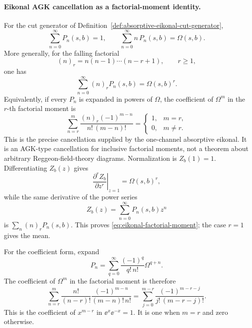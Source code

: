 \paragraph{Eikonal AGK cancellation as a factorial-moment identity.}
For the cut generator of
Definition~\ref{def:absorptive-eikonal-cut-generator},
\begin{equation}
  \sum_{n=0}^\infty P_n(s,b)=1,
  \qquad
  \sum_{n=0}^\infty n\,P_n(s,b)=\Omega(s,b).
  \label{eq:eikonal-cut-normalization-and-mean}
\end{equation}
More generally, for the falling factorial
\begin{equation}
  (n)_r=n(n-1)\cdots(n-r+1),
  \qquad r\ge1,
  \label{eq:falling-factorial-definition}
\end{equation}
one has
\begin{equation}
  \sum_{n=0}^\infty (n)_rP_n(s,b)=\Omega(s,b)^r.
  \label{eq:eikonal-factorial-moment}
\end{equation}
Equivalently, if every \(P_n\) is expanded in powers of \(\Omega\), the
coefficient of \(\Omega^m\) in the \(r\)-th factorial moment is
\begin{equation}
  \sum_{n=r}^{m}
  \frac{(n)_r(-1)^{m-n}}{n!\,(m-n)!}
  =
  \begin{cases}
    1,& m=r,\\
    0,& m\ne r.
  \end{cases}
  \label{eq:eikonal-agk-binomial-cancellation}
\end{equation}
This is the precise cancellation supplied by the one-channel absorptive
eikonal.  It is an AGK-type cancellation for inclusive factorial moments, not
a theorem about arbitrary Reggeon-field-theory diagrams.
Normalization is \(Z_b(1)=1\).  Differentiating \(Z_b(z)\) gives
\[
  \left.\frac{\partial^r Z_b}{\partial z^r}\right|_{z=1}
  =
  \Omega(s,b)^r,
\]
while the same derivative of the power series
\[
  Z_b(z)=\sum_{n=0}^\infty P_n(s,b)z^n
\]
is \(\sum_n(n)_rP_n(s,b)\).  This proves
\eqref{eq:eikonal-factorial-moment}; the case \(r=1\) gives the mean.

For the coefficient form, expand
\begin{equation}
  P_n=\sum_{q=0}^\infty
  \frac{(-1)^q}{q!\,n!}\Omega^{q+n}.
  \label{eq:eikonal-pn-power-expansion}
\end{equation}
The coefficient of \(\Omega^m\) in the factorial moment is therefore
\begin{equation}
  \sum_{n=r}^{m}
  \frac{n!}{(n-r)!}
  \frac{(-1)^{m-n}}{(m-n)!\,n!}
  =
  \sum_{j=0}^{m-r}
  \frac{(-1)^{m-r-j}}{j!\,(m-r-j)!}.
  \label{eq:eikonal-agk-binomial-proof}
\end{equation}
This is the coefficient of \(x^{m-r}\) in
\(\ee^x\ee^{-x}=1\).  It is one when \(m=r\) and zero otherwise.

